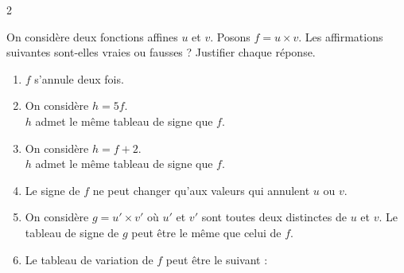 \documentclass[10pt,a4paper]{article}
\begin{document}
\begin{multicols}{2}
\begin{exo}
On considère deux fonctions affines \(u\) et \(v\). Posons \(f=u\times v\). Les affirmations suivantes sont-elles vraies ou fausses ? Justifier chaque réponse.

\begin{enumerate}[leftmargin=*]
    \item \(f\) s'annule deux fois.
    \item On considère \(h=5f\).\\ \(h\) admet le même tableau de signe que \(f\).
    \item On considère \(h=f+2\).\\ \(h\) admet le même tableau de signe que \(f\).
    \item Le signe de \(f\) ne peut changer qu'aux valeurs qui annulent \(u\) ou \(v\).
    \item On considère \(g=u'\times v'\) où \(u'\) et \(v'\) sont toutes deux distinctes de \(u\) et \(v\). Le tableau de signe de \(g\) peut être le même que celui de \(f\).
    \item Le tableau de variation de \(f\) peut être le suivant :
\end{enumerate}
\end{exo}
\prof{
    \begin{enumerate}
        \item 
    \end{enumerate}
}

\end{multicols}
\end{document}
